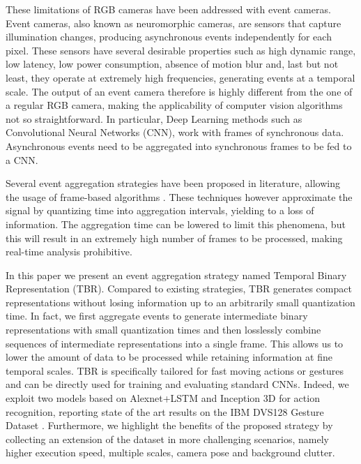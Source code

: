 \documentclass[a4paper,conference]{IEEEtran}
\begin{document}
These limitations of RGB cameras have been addressed with event cameras. Event cameras, also known as neuromorphic cameras, are sensors that capture illumination changes, producing asynchronous events independently for each pixel. These sensors have several desirable properties such as high dynamic range, low latency, low power consumption, absence of motion blur and, last but not least, they operate at extremely high frequencies, generating events at a  temporal scale. The output of an event camera therefore is highly different from the one of a regular RGB camera, making the applicability of computer vision algorithms not so straightforward. In particular, Deep Learning methods such as Convolutional Neural Networks (CNN), work with frames of synchronous data. Asynchronous events need to be aggregated into synchronous frames to be fed to a CNN.

Several event aggregation strategies have been proposed in literature, allowing the usage of frame-based algorithms \cite{nguyen2019real, miao2019neuromorphic, ghosh2019spatiotemporal, cannici2020differentiable, cannici2019asynchronous}. These techniques however approximate the signal by quantizing time into aggregation intervals, yielding to a loss of information. The aggregation time can be lowered to limit this phenomena, but this will result in an extremely high number of frames to be processed, making real-time analysis prohibitive.

In this paper we present an event aggregation strategy named Temporal Binary Representation (TBR). Compared to existing strategies, TBR generates compact representations without losing information up to an arbitrarily small quantization time. In fact, we first aggregate events to generate intermediate binary representations with small quantization times and then losslessly combine sequences of intermediate representations into a single frame. This allows us to lower the amount of data to be processed while retaining information at fine temporal scales. TBR is specifically tailored for fast moving actions or gestures and can be directly used for training and evaluating standard CNNs. Indeed, we exploit two models based on Alexnet+LSTM and Inception 3D for action recognition, reporting state of the art results on the IBM DVS128 Gesture Dataset \cite{amir2017low}. Furthermore, we highlight the benefits of the proposed strategy by collecting an extension of the dataset in more challenging scenarios, namely higher execution speed, multiple scales, camera pose and background clutter.
\end{document}
